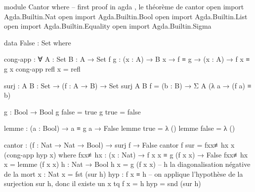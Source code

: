 
\begin{code}[cantor]
module Cantor  where
-- first proof in agda , le théorème de cantor
open import Agda.Builtin.Nat
open import Agda.Builtin.Bool
open import Agda.Builtin.List
open import Agda.Builtin.Equality
open import Agda.Builtin.Sigma

data False : Set where

cong-app : ∀ {A : Set } {B : A → Set } {f g : (x : A) → B x} →
           f ≡ g → (x : A) → f x ≡ g x
cong-app refl x = refl

surj : {A B : Set} → (f : A → B) → Set
surj  {A} {B} f =  (b : B) → Σ A (λ a → (f a) ≡ b)

g : Bool → Bool
g false = true
g true = false

lemme : (a : Bool) → a ≡ g a → False
lemme true = λ ()  
lemme false = λ ()  

cantor : (f : Nat → Nat → Bool) → surj f → False
cantor f sur = fxx≢hx x (cong-app hyp x) 
  where 
  fxx≢hx : (x : Nat) → f x x ≡ g (f x x) → False
  fxx≢hx x = lemme (f x x)
  h : Nat → Bool
  h x = g (f x x) -- h la diagonalisation négative de la mort
  x : Nat
  x = fst (sur h)
  hyp : f x ≡ h     -- on applique l'hypothèse de la surjection sur h, donc il existe un x tq f x = h
  hyp = snd (sur h)
  
\end{code}